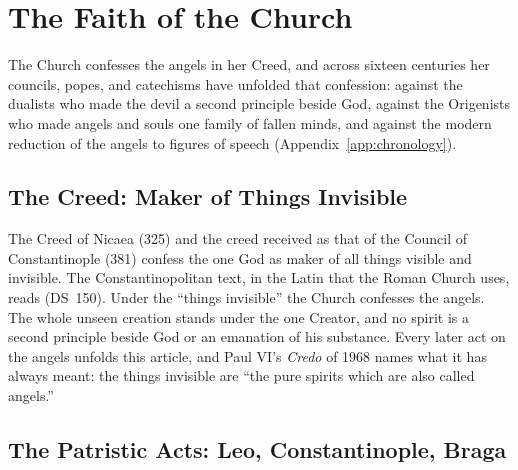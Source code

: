 \section{The Faith of the Church}\label{sec:faith}

The Church confesses the angels in her Creed, and across sixteen centuries
her councils, popes, and catechisms have unfolded that confession: against
the dualists who made the devil a second principle beside God, against the
Origenists who made angels and souls one family of fallen minds, and against
the modern reduction of the angels to figures of speech
(Appendix~\ref{app:chronology}).

\sectionguard
\subsection{The Creed: Maker of Things Invisible}

The Creed of Nicaea (325) and the creed received as that of the Council of
Constantinople (381) confess the one God as maker of all things visible and
invisible. The Constantinopolitan text, in the Latin that the Roman Church
uses, reads  (DS~150). Under the ``things invisible'' the Church confesses
the angels. The whole unseen creation stands under the one Creator, and no
spirit is a second principle beside God or an emanation of his substance.
Every later act on the angels unfolds this article, and Paul VI's
\emph{Credo} of 1968 names what it has always meant: the things invisible
are ``the pure spirits which are also called angels.''

\sectionguard
\subsection{The Patristic Acts: Leo, Constantinople, Braga}

